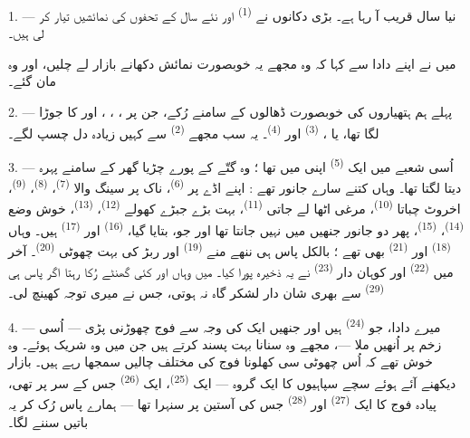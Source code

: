 \VUsaut{4.0mm}
\VUsaut{2.0mm}
\VUsaut{3.4mm}

1. --- نیا سال قریب آ رہا ہے۔ بڑی دکانوں نے 
\textsuperscript{(1)} اور نئے سال کے تحفوں کی نمائشیں تیار کر لی ہیں۔

میں نے اپنے دادا سے کہا کہ وہ مجھے یہ خوبصورت نمائش دکھانے بازار لے
چلیں، اور وہ مان گئے۔

2. --- پہلے ہم ہتھیاروں کی خوبصورت ڈھالوں کے سامنے رُکے، جن پر
، ، ،  اور  کا جوڑا لگا تھا، یا
،  \textsuperscript{(3)} اور 
\textsuperscript{(4)}۔ یہ سب مجھے 
\textsuperscript{(2)} سے کہیں زیادہ دل چسپ لگے۔

\VUsaut{3.0mm}
\VUsaut{2.6mm}

3. --- اُسی شعبے میں ایک  \textsuperscript{(5)} اپنی
 میں تھا ؛ وہ گتّے کے پورے چڑیا گھر کے سامنے
پہرہ دیتا لگتا تھا۔ وہاں کتنے سارے جانور تھے : اپنے اڈے پر
 \textsuperscript{(6)}، ناک پر سینگ والا 
\textsuperscript{(7)}،  \textsuperscript{(8)}،
 \textsuperscript{(9)}، اخروٹ چباتا 
\textsuperscript{(10)}، مرغی اٹھا لے جاتی 
\textsuperscript{(11)}، بہت بڑے جبڑے کھولے 
\textsuperscript{(12)}،  \textsuperscript{(13)}، خوش وضع
 \textsuperscript{(14)}، 
\textsuperscript{(15)}، پھر دو جانور جنھیں میں نہیں جانتا تھا اور جو،
بتایا گیا،  \textsuperscript{(16)} اور 
\textsuperscript{(17)} ہیں۔ وہاں  \textsuperscript{(18)}
اور  \textsuperscript{(21)} بھی تھے ؛ بالکل پاس ہی
ننھے منے  \textsuperscript{(19)} اور ربڑ کی بہت چھوٹی
 \textsuperscript{(20)}۔ آخر میں 
\textsuperscript{(22)} اور کوہان دار 
\textsuperscript{(23)} نے یہ ذخیرہ پورا کیا۔ میں وہاں اور کئی گھنٹے
رُکا رہتا اگر پاس ہی  \textsuperscript{(29)}
سے بھری شان دار لشکر گاہ نہ ہوتی، جس نے میری توجہ کھینچ لی۔

\VUsaut{4.0mm}
\VUsaut{2.8mm}

4. --- میرے دادا، جو  \textsuperscript{(24)} ہیں اور
جنھیں ایک  کی وجہ سے فوج چھوڑنی پڑی — اُسی زخم پر اُنھیں
 ملا —، مجھے وہ  سنانا بہت پسند کرتے
ہیں جن میں وہ شریک ہوئے۔ وہ خوش تھے کہ اُس چھوٹی سی کھلونا فوج کی
مختلف چالیں سمجھا رہے ہیں۔ بازار دیکھنے آئے ہوئے سچے سپاہیوں کا ایک
گروہ — ایک  \textsuperscript{(25)}، ایک
 \textsuperscript{(26)} جس کے سر پر
 تھی، پیادہ فوج کا ایک 
\textsuperscript{(27)} اور 
\textsuperscript{(28)} جس کی آستین پر سنہرا  تھا — ہمارے
پاس رُک کر یہ باتیں سننے لگا۔

